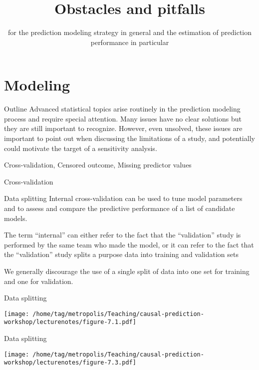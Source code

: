 \documentclass{beamer}\usepackage{listings}
\institute{}
\subtitle{for the prediction modeling strategy in general and the estimation of prediction performance in particular}
\date{}
\title{Obstacles and pitfalls}
\begin{document}
\maketitle
\section{Modeling}
\label{sec:orge8f0ab9}

\begin{frame}[label={sec:orgebec7b2}]{Outline}
Advanced statistical topics arise routinely in the prediction
modeling process and require special attention.
\vfill
Many issues
have no clear solutions but they are still important to
recognize.
\vfill
However, even unsolved, these issues are important to point
out when discussing the limitations of a study, and potentially could
motivate the target of a sensitivity analysis.
\vfill

Cross-validation, Censored outcome, Missing predictor values
\end{frame}
\begin{frame}[label={sec:org4086a70}]{}
\huge \color{white}
Cross-validation
\end{frame}
\begin{frame}[label={sec:org8bf1545}]{Data splitting}
Internal cross-validation can be used to tune model parameters and to
assess and compare the predictive performance of a list of candidate
models.

\vfill The term ``internal'' can either refer to the fact that the
``validation'' study is performed by the same team who made the model,
or it can refer to the fact that the ``validation'' study splits a
purpose data into training and validation sets \vfill

We generally \alert{discourage} the use of a \alert{single split} of data into one set
for training and one for validation.
\end{frame}
\begin{frame}[label={sec:orgd4bedad}]{Data splitting}
\begin{center}
\texttt{[image: /home/tag/metropolis/Teaching/causal-prediction-workshop/lecturenotes/figure-7.1.pdf]}
\end{center}
\end{frame}
\begin{frame}[label={sec:orgf9a7ba8}]{Data splitting}
\begin{center}
\texttt{[image: /home/tag/metropolis/Teaching/causal-prediction-workshop/lecturenotes/figure-7.3.pdf]}
\end{center}
\end{frame}
\end{document}
